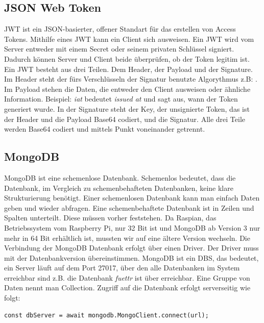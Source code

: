\subsection{JSON Web Token}
\label{sec:vor-jwt}
\ac{JWT} ist ein JSON-basierter, offener Standart für das erstellen von Access Tokens. Mithilfe eines \ac{JWT} kann ein Client sich ausweisen. Ein \ac{JWT} wird vom Server entweder mit einem Secret oder seinem privaten Schlüssel signiert. Dadurch können Server und Client beide überprüfen, ob der Token legitim ist. Ein \ac{JWT} besteht aus drei Teilen. Dem Header, der Payload und der Signature. Im Header steht der fürs Verschlüsseln der Signatur benutzte Algorythmus z.B: . Im Payload stehen die Daten, die entweder den Client ausweisen oder ähnliche Information. Beispiel:  \textit{iat} bedeutet \textit{issued at} und sagt aus, wann der Token generiert wurde. In der Signature steht der Key, der unsignierte Token, das ist der Header und die Payload Base64 codiert, und die Signatur. Alle drei Teile werden Base64 codiert und mittels Punkt voneinander getrennt.

\subsection{MongoDB}
\label{sec:vor-mongo}
MongoDB ist eine schemenlose Datenbank. Schemenlos bedeutet, dass die Datenbank, im Vergleich zu schemenbehafteten Datenbanken, keine klare Strukturierung benötigt. Einer schemenlosen Datenbank kann man einfach Daten geben und wieder abfragen. Eine schemenbehaftete Datenbank ist in Zeilen und Spalten unterteilt. Diese müssen vorher feststehen. Da Raspian, das Betriebssystem vom Raspberry Pi, nur 32 Bit ist und MongoDB ab Version 3 nur mehr in 64 Bit erhältlich ist, mussten wir auf eine ältere Version wechseln. Die Verbindung der MongoDB Datenbank erfolgt über einen Driver. Der Driver muss mit der Datenbankversion übereinstimmen. MongoDB ist ein \ac{DBS}, das bedeutet, ein Server läuft auf dem Port 27017, über den alle Datenbanken im System erreichbar sind z.B. die Datenbank \textit{fuettr} ist über  erreichbar. Eine Gruppe von Daten nennt man Collection. Zugriff auf die Datenbank erfolgt serverseitig wie folgt:

\begin{lstlisting}[caption=Verbinden mit dem \ac{DBS},style=TS]
const dbServer = await mongodb.MongoClient.connect(url);
\end{lstlisting}

